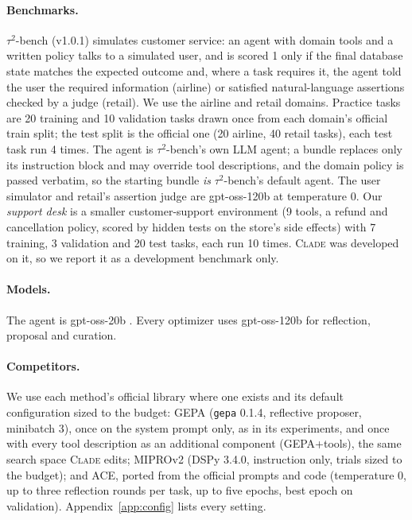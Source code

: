 \documentclass[11pt]{article}
\newcommand{\clade}{\textsc{Clade}\xspace}
\newcommand{\taub}{$\tau^2$-bench\xspace}
\begin{document}
\paragraph{Benchmarks.} \taub \citep{tau2bench} (v1.0.1) simulates customer service: an agent with domain tools and a
written policy talks to a simulated user, and is scored 1 only if the final database state matches the expected
outcome and, where a task requires it, the agent told the user the required information (airline) or satisfied
natural-language assertions checked by a judge (retail). We use the airline and retail domains. Practice tasks are
20 training and 10 validation tasks drawn once from each domain's official train split; the test split is the
official one (20 airline, 40 retail tasks), each test task run 4 times. The agent is \taub's own LLM agent; a bundle
replaces only its instruction block and may override tool descriptions, and the domain policy is passed verbatim, so
the starting bundle \emph{is} \taub's default agent. The user simulator and retail's assertion judge are gpt-oss-120b
at temperature 0. Our \emph{support desk} is a smaller customer-support environment (9 tools, a refund and
cancellation policy, scored by hidden tests on the store's side effects) with 7 training, 3 validation and 20 test
tasks, each run 10 times. \clade was developed on it, so we report it as a development benchmark only.

\paragraph{Models.} The agent is gpt-oss-20b \citep{gptoss}. Every optimizer uses gpt-oss-120b for reflection,
proposal and curation.

\paragraph{Competitors.} We use each method's official library where one exists and its default configuration sized
to the budget: GEPA (\texttt{gepa} 0.1.4, reflective proposer, minibatch 3), once on the system prompt only, as in its
experiments, and once with every tool description as an additional component (GEPA+tools), the same search space
\clade edits; MIPROv2 (DSPy 3.4.0, instruction only, trials sized to the budget); and ACE, ported from the official
prompts and code (temperature 0, up to three reflection rounds per task, up to five epochs, best epoch on
validation). Appendix~\ref{app:config} lists every setting.
\end{document}
